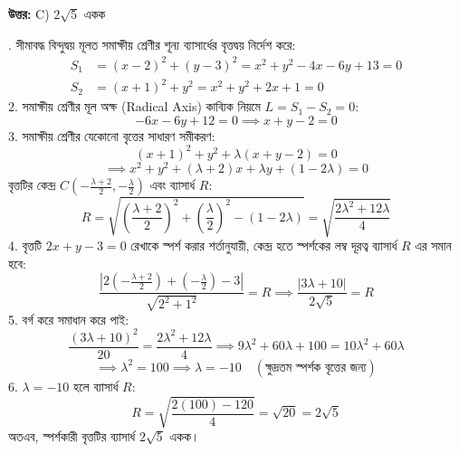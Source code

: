 \documentclass[12pt, a4paper]{article}
\begin{document}
\vspace{0.5em}
\begin{tcolorbox}[answerbox]
    \textbf{\color{success} উত্তর:} C) $2\sqrt{5}$ একক
\end{tcolorbox}
\vspace{1em}

\begin{tcolorbox}[solutionbox={সমাধান (Solution)}]
    . সীমাবদ্ধ বিন্দুদ্বয় মূলত সমাক্ষীয় শ্রেণীর শূন্য ব্যাসার্ধের বৃত্তদ্বয় নির্দেশ করে:
    \begin{align*}
        S_1 &= (x - 2)^2 + (y - 3)^2 = x^2 + y^2 - 4x - 6y + 13 = 0 \\
        S_2 &= (x + 1)^2 + y^2 = x^2 + y^2 + 2x + 1 = 0
    \end{align*}
    2. সমাক্ষীয় শ্রেণীর মূল অক্ষ (Radical Axis) কাব্যিক নিয়মে $L = S_1 - S_2 = 0$:
    \[ -6x - 6y + 12 = 0 \implies x + y - 2 = 0 \]
    3. সমাক্ষীয় শ্রেণীর যেকোনো বৃত্তের সাধারণ সমীকরণ:
    \[ (x + 1)^2 + y^2 + \lambda(x + y - 2) = 0 \]
    \[ \implies x^2 + y^2 + (\lambda + 2)x + \lambda y + (1 - 2\lambda) = 0 \]
    বৃত্তটির কেন্দ্র $C\left(-\frac{\lambda + 2}{2}, -\frac{\lambda}{2}\right)$ এবং ব্যাসার্ধ $R$:
    \[ R = \sqrt{\left(\frac{\lambda + 2}{2}\right)^2 + \left(\frac{\lambda}{2}\right)^2 - (1 - 2\lambda)} = \sqrt{\frac{2\lambda^2 + 12\lambda}{4}} \]
    4. বৃত্তটি $2x + y - 3 = 0$ রেখাকে স্পর্শ করার শর্তানুযায়ী, কেন্দ্র হতে স্পর্শকের লম্ব দূরত্ব ব্যাসার্ধ $R$ এর সমান হবে:
    \[ \frac{\left|2\left(-\frac{\lambda + 2}{2}\right) + \left(-\frac{\lambda}{2}\right) - 3\right|}{\sqrt{2^2 + 1^2}} = R \implies \frac{|3\lambda + 10|}{2\sqrt{5}} = R \]
    5. বর্গ করে সমাধান করে পাই:
    \[ \frac{(3\lambda + 10)^2}{20} = \frac{2\lambda^2 + 12\lambda}{4} \implies 9\lambda^2 + 60\lambda + 100 = 10\lambda^2 + 60\lambda \]
    \[ \implies \lambda^2 = 100 \implies \lambda = -10 \quad (\text{ক্ষুদ্রতম স্পর্শক বৃত্তের জন্য}) \]
    6. $\lambda = -10$ হলে ব্যাসার্ধ $R$:
    \[ R = \sqrt{\frac{2(100) - 120}{4}} = \sqrt{20} = 2\sqrt{5} \]
    অতএব, স্পর্শকারী বৃত্তটির ব্যাসার্ধ $2\sqrt{5}$ একক।
\end{tcolorbox}
\end{document}
